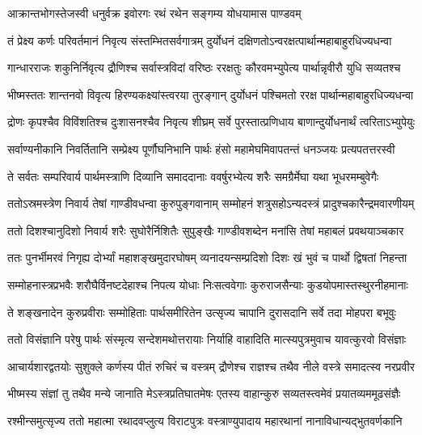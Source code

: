 \twolineshloka
{आक्रान्तभोगस्तेजस्वी धनुर्वक्र इवोरगः}
{रथं रथेन सङ्गम्य योधयामास पाण्डवम्}


\twolineshloka
{तं प्रेक्ष्य कर्णः परिवर्तमानं निवृत्य संस्तम्भितसर्वगात्रम्}
{दुर्योधनं दक्षिणतोऽन्वरक्षत्पार्थान्महाबाहुरधिज्यधन्वा}


\twolineshloka
{गान्धारराजः शकुनिर्निवृत्य द्रौणिश्च सर्वास्त्रविदां वरिष्ठः}
{ररक्षतुः कौरवमभ्युपेत्य पार्थान्नृवीरौ युधि सव्यतश्च}


\twolineshloka
{भीष्मस्ततः शान्तनवो विवृत्य हिरण्यकक्ष्यांस्त्वरया तुरङ्गान्}
{दुर्योधनं पश्चिमतो ररक्ष पार्थान्महाबाहुरधिज्यधन्वा}


\twolineshloka
{द्रोणः कृपश्चैव विविंशतिश्च दुःशासनश्चैव निवृत्य शीघ्रम्}
{सर्वे पुरस्तात्प्रणिधाय बाणान्दुर्योधनार्थं त्वरिताऽभ्युपेयुः}


\twolineshloka
{सर्वाण्यनीकानि निवर्तितानि सम्प्रेक्ष्य पूर्णौघनिभानि पार्थः}
{हंसो महामेघमिवापतन्तं धनञ्जयः प्रत्यपतत्तरस्वी}


\twolineshloka
{ते सर्वतः सम्परिवार्य पार्थमस्त्राणि दिव्यानि समाददानाः}
{ववर्षुरभ्येत्य शरैः समग्रैर्मेघा यथा भूधरमम्बुवेगैः}


\twolineshloka
{ततोऽस्रमस्त्रेण निवार्य तेषां गाण्डीवधन्वा कुरुपुङ्गवानाम्}
{सम्मोहनं शत्रुसहोऽन्यदस्त्रं प्रादुश्चकारैन्द्रमवारणीयम्}


\twolineshloka
{ततो दिशश्चानुदिशो निवार्य शरैः सुघोरैर्निशितैः सुपुङ्खैः}
{गाण्डीवशब्देन मनांसि तेषां महाबलं प्रवथयाञ्चकार}


\twolineshloka
{ततः पुनर्भीमरवं निगृह्य दोर्भ्यां महाशङ्खमुदारघोषम्}
{व्यनादयन्सम्प्रदिशो दिशः खं भुवं च पार्थो द्विषतां निहन्ता}


\twolineshloka
{सम्मोहनास्त्रप्रभवैः शरौघैर्विनष्टदेहाश्च निपत्य योधाः}
{निःसत्ववेगाः कुरुराजसैन्याः कुडयोपमास्तस्थुरनीहमानाः}


\twolineshloka
{ते शङ्खनादेन कुरुप्रवीराः सम्मोहिताः पार्थसमीरितेन}
{उत्सृज्य चापानि दुरासदानि सर्वे तदा मोहपरा बभूवुः}


\twolineshloka
{ततो विसंज्ञानि परेषु पार्थः संस्मृत्य सन्देशमथोत्तरायाः}
{निर्याहि वाहादिति मात्स्यपुत्रमुवाच यावत्कुरवो विसंज्ञाः}


\twolineshloka
{आचार्यशारद्वतयोः सुशुक्ले कर्णस्य पीतं रुचिरं च वस्त्रम्}
{द्रौणेश्च राज्ञश्च तथैव नीले वस्त्रे समादत्स्व नरप्रवीर}


\twolineshloka
{भीष्मस्य संज्ञां तु तथैव मन्ये जानाति मेऽस्त्रप्रतिघातमेषः}
{एतस्य वाहान्कुरु सव्यतस्त्वमेवं प्रयातव्यममूढसंज्ञैः}


\twolineshloka
{रश्मीन्समुत्सृज्य ततो महात्मा रथादवप्लुत्य विराटपुत्रः}
{वस्त्राण्युपादाय महारथानां नानाविधान्यद्भुतवर्णकानि}


